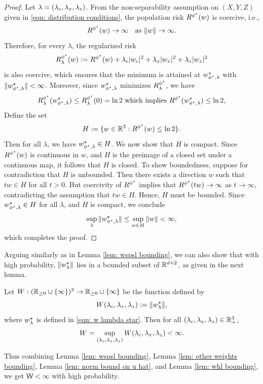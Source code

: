\begin{proof}
    Let $\lambda = (\lambda_c,\lambda_x,\lambda_z)$. From the non-separability assumption on $(X,Y,Z)$ given in \eqref{eqn: distribution conditions}, the population risk $R^{\phi^\star}(w)$ is coercive, i.e.,
    \begin{equation*}
        R^{\phi^\star}(w) \to \infty \quad \text{as } \|w\| \to \infty.
    \end{equation*}
    Therefore, for every $\lambda$, the regularized risk
    \begin{equation*}
    R^{\phi^\star}_\lambda(w) := R^{\phi^\star}(w) + \lambda_c |w_c|^2 + \lambda_x |w_x|^2 + \lambda_z |w_z|^2
    \end{equation*}
    is also coercive, which ensures that the minimum is attained at $w^\star_{\phi^{\star},\lambda}$ with $\|w^\star_{\phi^{\star},\lambda}\| < \infty$.
    Moreover, since $w^\star_{\phi^{\star},\lambda}$ minimizes $R^{\phi^\star}_\lambda$, we have
    \begin{equation*}
        R^{\phi^\star}_\lambda(w^\star_{\phi^{\star},\lambda})  \leq R^{\phi^\star}_\lambda(0) = \ln 2 \text{ which implies } R^{\phi^\star}(w^\star_{\phi^{\star},\lambda}) \leq \ln 2,
    \end{equation*}
    Define the set
    \begin{equation*}
         H := \{w \in \mathbb{R}^3 : R^{\phi^\star}(w) \le \ln 2\}.
    \end{equation*}
    Then for all $\lambda$, we have $w^\star_{\phi^{\star},\lambda} \in H$.
We now show that $H$ is compact. Since $R^{\phi^\star}(w)$ is continuous in $w$, and $H$ is the preimage of a closed set under a continuous map, it follows that $H$ is closed. To show boundedness, suppose for contradiction that $H$ is unbounded. Then there exists a direction $w$ such that $tw \in H$ for all $t > 0$. But coercivity of $R^{\phi^\star}$ implies that $R^{\phi^\star}(tw) \to \infty$ as $t \to \infty$, contradicting the assumption that $tw \in H$. Hence, $H$ must be bounded. Since $w^\star_{\phi^{\star},\lambda} \in H$ for all $\lambda$, and $H$ is compact, we conclude  
    \begin{equation*}
        \sup_{\lambda} \|w^\star_{\phi^{\star},\lambda}\| \le \sup_{w \in H} \|w\| < \infty,
       \end{equation*}
which completes the proof.

\end{proof}
Arguing similarly as in Lemma \ref{lem: wspsl bounding}, we can also show that with high probability, $\|w^\star_{\lambda}\|$ lies in a bounded subset of $\mathbb{R}^{d+2}$, as given in the next lemma.
\begin{lem}\label{lem: other weights bounding}
 Let $W: (\mathbb{R}_{\geq 0} \cup \{\infty\})^3 \rightarrow \mathbb{R}_{\geq 0} \cup \{\infty\}$ be the function defined by
    \begin{equation}
        W(\lambda_c,\lambda_x,\lambda_z) := \|w^\star_{\lambda}\|,
    \end{equation}
    where $w^\star_{\lambda}$ is defined in \eqref{eqn: w lambda star}.
    Then for all $(\lambda_c,\lambda_x,\lambda_z) \in \mathbb{R}^3_+$,
    \begin{equation*}
        W = \sup_{(\lambda_c,\lambda_x,\lambda_z)} W(\lambda_c,\lambda_x,\lambda_z) < \infty.
    \end{equation*}
\end{lem}
Thus combining Lemma \ref{lem: wspsl bounding}, Lemma \ref{lem: other weights bounding}, Lemma \ref{lem: norm bound on u hat}, and Lemma \ref{lem: whl bounding}, we get $\mathsf{W} < \infty$ with high probability.

